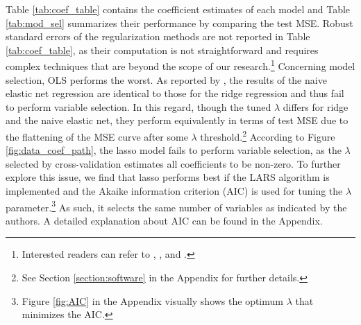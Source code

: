 \noindent Table \ref{tab:coef_table} contains the coefficient estimates of each model and Table \ref{tab:mod_sel} summarizes their performance by comparing the test MSE. Robust standard errors of the regularization methods are not reported in Table \ref{tab:coef_table}, as their computation is not straightforward and requires complex techniques that are beyond the scope of our research.\footnote{Interested readers can refer to \cite{vinod1995double}, \cite{chatterjee2011bootstrapping}, and \cite{casella2010penalized}.} Concerning model selection, OLS performs the worst. As reported by \cite{zou2005regularization}, the results of the naive elastic net regression are identical to those for the ridge regression and thus fail to perform variable selection. In this regard, though the tuned $\lambda$ differs for ridge and the naive elastic net, they perform equivalently in terms of test MSE due to the flattening of the MSE curve after some $\lambda$ threshold.\footnote{See Section \ref{section:software} in the Appendix for further details.} According to Figure \ref{fig:data_coef_path}, the lasso model fails to perform variable selection, as the $\lambda$ selected by cross-validation estimates all coefficients to be non-zero. To further explore this issue, we find that lasso performs best if the LARS algorithm is implemented and the Akaike information criterion (AIC) is used for tuning the $\lambda$ parameter.\footnote{Figure \ref{fig:AIC} in the Appendix visually shows the optimum $\lambda$ that minimizes the AIC.} As such, it selects the same number of variables as indicated by the authors. A detailed explanation about AIC can be found in the Appendix.





